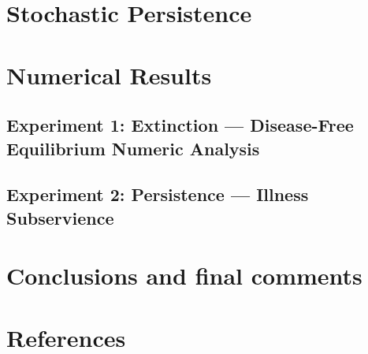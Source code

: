 \documentclass[3p,sort&compress]{elsarticle}
\DeclareRobustCommand{\1}[1]{\ensuremath \mathbbm{1}_{\{#1\}}}
\begin{document}
	\section{Stochastic Persistence}
		
	\section{Numerical Results}
		
		\subsection{
			Experiment 1: Extinction --- 
			Disease-Free Equilibrium Numeric
			Analysis
		} 
			
		\subsection{Experiment 2: Persistence 
		--- Illness Subservience}
			
	\section{Conclusions and final comments}
		
		
	\pagebreak
	\appendix
	\renewcommand*{\thesection}{\appendixname~\Alph{section}}
	\renewcommand{\thetheorem}{\Alph{section}.\arabic{theorem}}
	\renewcommand{\thedefinition}{\Alph{section}.\arabic{definition}}
		
	\section*{References}
		
		
\end{document}
